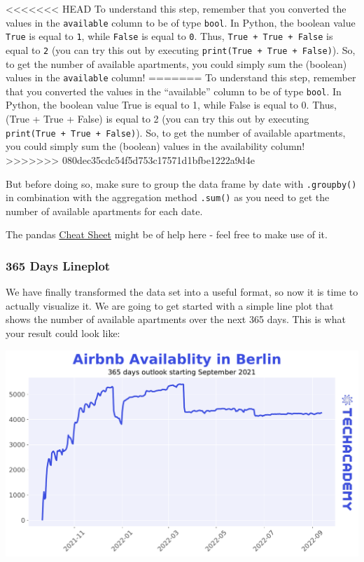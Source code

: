 \documentclass[
  11pt,
]{article}
\newenvironment{tipsp}[1]
  {
  \begin{itemize}
  \footnotesize
  \renewcommand{\labelitemi}{
    \raisebox{-.7\height}[0pt][0pt]{
      {\setkeys{Gin}{width=3em,keepaspectratio}
        \texttt{[image: images/\#1.png]}}
    }
  }
  \setlength{\fboxsep}{1em}
  \begin{pbox}
  \item
  }
  {
  \end{pbox}
  \end{itemize}
  }
\begin{document}
\begin{tipsp}p
<<<<<<< HEAD
To understand this step, remember that you converted the values in the \texttt{available} column to be of type \texttt{bool}.
In Python, the boolean value \texttt{True} is equal to \texttt{1}, while \texttt{False} is equal to \texttt{0}.
Thus, \texttt{True\ +\ True\ +\ False} is equal to \texttt{2} (you can try this out by executing \texttt{print(True\ +\ True\ +\ False)}).
So, to get the number of available apartments, you could simply sum the (boolean) values in the \texttt{available} column!
=======
To understand this step, remember that you converted the values in the ``available'' column to be of type \texttt{bool}. In Python, the boolean value True is equal to 1, while False is equal to 0. Thus, (True + True + False) is equal to 2 (you can try this out by executing \texttt{print(True\ +\ True\ +\ False)}). So, to get the number of available apartments, you could simply sum the (boolean) values in the availability column!
>>>>>>> 080dec35cdc54f5d753c17571d1bfbe1222a9d4e

But before doing so, make sure to group the data frame by date with \texttt{.groupby()} in combination with the aggregation method \texttt{.sum()} as you need to get the number of available apartments for each date.

The pandas \href{https://pandas.pydata.org/Pandas_Cheat_Sheet.pdf}{Cheat Sheet} might be of help here - feel free to make use of it.

\end{tipsp}

\hypertarget{days-lineplot}{%
\subsubsection{365 Days Lineplot}\label{days-lineplot}}

We have finally transformed the data set into a useful format, so now it is time to actually visualize it.
We are going to get started with a simple line plot that shows the number of available apartments over the next 365 days.
This is what your result could look like:

\begin{center}\includegraphics[width=1\linewidth]{plot/01_python/availability} \end{center}
\end{document}
